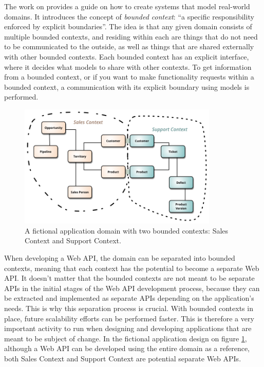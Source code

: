 \documentclass[10pt,article]{IEEEtran}
\begin{document}
The work on \cite{evans:ddd} provides a guide on how to create systems that model real-world domains. It introduces the concept of \textit{bounded context}: ``a specific responsibility enforced by explicit boundaries''. The idea is that any given domain consists of multiple bounded contexts, and residing within each are things that do not need to be communicated to the outside, as well as things that are shared externally with other bounded contexts. Each bounded context has an explicit interface, where it decides what models to share with other contexts.
To get information from a bounded context, or if you want to make functionality requests within a bounded context, a communication with its explicit boundary using models is performed.

\begin{figure}[h]
    \hspace{-0.5cm}
    \includegraphics[width=9.5cm]{bounded-context}
    \caption{A fictional application domain with two bounded contexts: Sales Context and Support Context.\cite{fowler:bounded-context}}
    \label{fig:bounded-context}
\end{figure}


When developing a Web API, the domain can be separated into bounded contexts, meaning that each context has the potential to become a separate Web API. It doesn’t matter that the bounded contexts are not meant to be separate APIs in the initial stages of the Web API development process, because they can be extracted and implemented as separate APIs depending on the application’s needs.  This is why this separation process is crucial. With bounded contexts in place, future scalability efforts can be performed faster. This is therefore a very important activity to run when designing and developing applications that are meant to be subject of change. In the fictional application design on figure \ref{fig:bounded-context}, although a Web API can be developed using the entire domain as a reference, both Sales Context and Support Context are potential separate Web APIs. 
\end{document}
